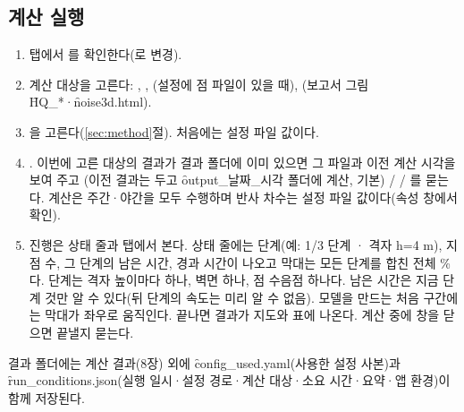 \documentclass[10.5pt,a4paper]{article}
\begin{document}
\subsection{계산 실행}
\begin{enumerate}
\item {} 탭에서 를 확인한다(로 변경).
\item 계산 대상을 고른다: , , (설정에 점 파일이 있을 때), (보고서 그림 \f{HQ\_*}·\f{noise3d.html}).
\item {}을 고른다(\ref{sec:method}절). 처음에는 설정 파일 값이다.
\item {}. 이번에 고른 대상의 결과가 결과 폴더에 이미 있으면 그 파일과 이전 계산 시각을 보여 주고 (이전 결과는 두고 \f{output\_날짜\_시각} 폴더에 계산, 기본) /  / 를 묻는다. 계산은 주간·야간을 모두 수행하며 반사 차수는 설정 파일 값이다(속성 창에서 확인).
\item 진행은 상태 줄과  탭에서 본다. 상태 줄에는 단계(예: 1/3 단계 · 격자 h=4 m), 지점 수, 그 단계의 남은 시간, 경과 시간이 나오고 막대는 모든 단계를 합친 전체 \%다. 단계는 격자 높이마다 하나, 벽면 하나, 점 수음점 하나다. 남은 시간은 지금 단계 것만 알 수 있다(뒤 단계의 속도는 미리 알 수 없음). 모델을 만드는 처음 구간에는 막대가 좌우로 움직인다. 끝나면 결과가 지도와 표에 나온다. 계산 중에 창을 닫으면 끝낼지 묻는다.
\end{enumerate}
결과 폴더에는 계산 결과(8장) 외에 \f{config\_used.yaml}(사용한 설정 사본)과 \f{run\_conditions.json}(실행 일시·설정 경로·계산 대상·소요 시간·요약·앱 환경)이 함께 저장된다.
\end{document}
